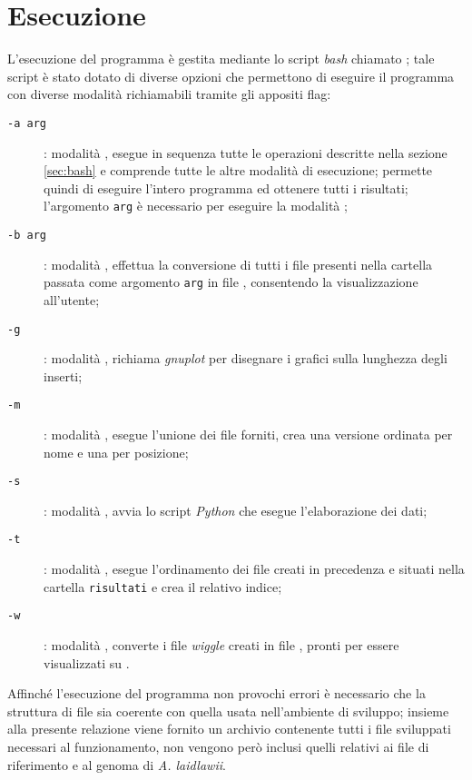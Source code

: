 \clearpage
\section{Esecuzione}
L'esecuzione del programma è gestita mediante lo script \emph{bash} chiamato ; tale script è stato dotato di diverse opzioni che permettono di eseguire il programma con diverse modalità richiamabili tramite gli appositi flag:

\begin{description}
\item[\texttt{-a arg}]: modalità , esegue in sequenza tutte le operazioni descritte nella sezione \ref{sec:bash} e comprende tutte le altre modalità di esecuzione; permette quindi di eseguire l'intero programma ed ottenere tutti i risultati; l'argomento \texttt{arg} è necessario per eseguire la modalità ;
\item[\texttt{-b arg}]: modalità , effettua la conversione di tutti i file  presenti nella cartella passata come argomento \texttt{arg} in file , consentendo la visualizzazione all'utente;
\item[\texttt{-g}]: modalità , richiama \emph{gnuplot} per disegnare i grafici sulla lunghezza degli inserti;
\item[\texttt{-m}]: modalità , esegue l'unione dei file  forniti, crea una versione ordinata per nome e una per posizione;
\item[\texttt{-s}]: modalità , avvia lo script \emph{Python} che esegue l'elaborazione dei dati;
\item[\texttt{-t}]: modalità , esegue l'ordinamento dei file  creati in precedenza e situati nella cartella \texttt{risultati} e crea il relativo indice;
\item[\texttt{-w}]: modalità , converte i file \emph{wiggle} creati in file , pronti per essere visualizzati su .
\end{description}

Affinché l'esecuzione del programma non provochi errori è necessario che la struttura di file sia coerente con quella usata nell'ambiente di sviluppo; insieme alla presente relazione viene fornito un archivio contenente tutti i file sviluppati necessari al funzionamento, non vengono però inclusi quelli relativi ai file  di riferimento e al genoma di \emph{A. laidlawii}.

